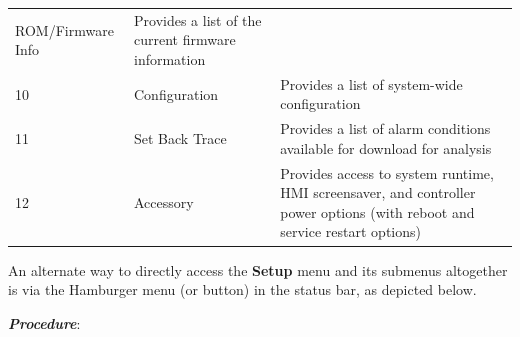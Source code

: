 \begin{longtable}[]{@{}|l|l|l|@{}}
\begin{minipage}[t]{0.23\columnwidth}
ROM/Firmware Info\strut
\end{minipage} & \begin{minipage}[t]{0.65\columnwidth}\raggedright
Provides a list of the current firmware information\strut
\end{minipage}\tabularnewline
\begin{minipage}[t]{0.04\columnwidth}\raggedright
10\strut
\end{minipage} & \begin{minipage}[t]{0.23\columnwidth}\raggedright
Configuration\strut
\end{minipage} & \begin{minipage}[t]{0.65\columnwidth}\raggedright
Provides a list of system-wide configuration\strut
\end{minipage}\tabularnewline
\begin{minipage}[t]{0.04\columnwidth}\raggedright
11\strut
\end{minipage} & \begin{minipage}[t]{0.23\columnwidth}\raggedright
Set Back Trace\strut
\end{minipage} & \begin{minipage}[t]{0.65\columnwidth}\raggedright
Provides a list of alarm conditions available for download for
analysis\strut
\end{minipage}\tabularnewline
\begin{minipage}[t]{0.04\columnwidth}\raggedright
12\strut
\end{minipage} & \begin{minipage}[t]{0.23\columnwidth}\raggedright
Accessory\strut
\end{minipage} & \begin{minipage}[t]{0.65\columnwidth}\raggedright
Provides access to system runtime, HMI screensaver, and controller power
options (with reboot and service restart options)\strut
\end{minipage}\tabularnewline
\bottomrule
\end{longtable}

\pagebreak
An alternate way to directly access the \textbf{Setup} menu and its
submenus altogether is via the Hamburger menu (or button) in the status
bar, as depicted below.

\textbf{\emph{Procedure}}:

